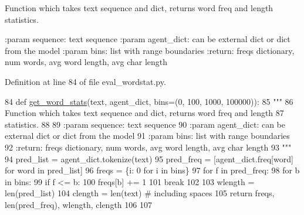 \begin{DoxyVerb}Function which takes text sequence and dict, returns word freq and length
statistics.

:param sequence: text sequence
:param agent_dict: can be external dict or dict from the model
:param bins: list with range boundaries
:return: freqs dictionary, num words, avg word length, avg char length
\end{DoxyVerb}
 

Definition at line 84 of file eval\+\_\+wordstat.\+py.


\begin{DoxyCode}
84 \textcolor{keyword}{def }\hyperlink{namespaceprojects_1_1controllable__dialogue_1_1eval__wordstat_af8f7aeddab4a5c7f0a5597bdb09f40ae}{get\_word\_stats}(text, agent\_dict, bins=(0, 100, 1000, 100000)):
85     \textcolor{stringliteral}{"""}
86 \textcolor{stringliteral}{    Function which takes text sequence and dict, returns word freq and length}
87 \textcolor{stringliteral}{    statistics.}
88 \textcolor{stringliteral}{}
89 \textcolor{stringliteral}{    :param sequence: text sequence}
90 \textcolor{stringliteral}{    :param agent\_dict: can be external dict or dict from the model}
91 \textcolor{stringliteral}{    :param bins: list with range boundaries}
92 \textcolor{stringliteral}{    :return: freqs dictionary, num words, avg word length, avg char length}
93 \textcolor{stringliteral}{    """}
94     pred\_list = agent\_dict.tokenize(text)
95     pred\_freq = [agent\_dict.freq[word] \textcolor{keywordflow}{for} word \textcolor{keywordflow}{in} pred\_list]
96     freqs = \{i: 0 \textcolor{keywordflow}{for} i \textcolor{keywordflow}{in} bins\}
97     \textcolor{keywordflow}{for} f \textcolor{keywordflow}{in} pred\_freq:
98         \textcolor{keywordflow}{for} b \textcolor{keywordflow}{in} bins:
99             \textcolor{keywordflow}{if} f <= b:
100                 freqs[b] += 1
101                 \textcolor{keywordflow}{break}
102 
103     wlength = len(pred\_list)
104     clength = len(text)  \textcolor{comment}{# including spaces}
105     \textcolor{keywordflow}{return} freqs, len(pred\_freq), wlength, clength
106 
107 
\end{DoxyCode}
\mbox{\label{namespaceparlai_1_1scripts_1_1eval__wordstat_af41cd95533433b93e7383bc6dab04963}} 
